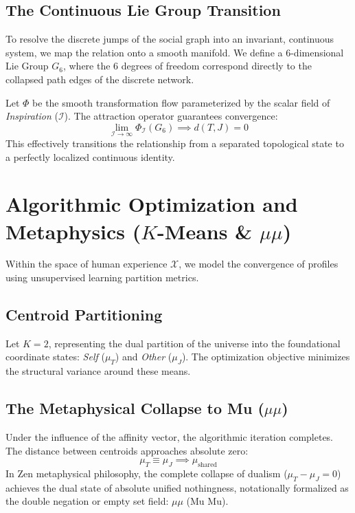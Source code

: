 \documentclass[11pt,fleqn]{article}
\begin{document}
\subsection{The Continuous Lie Group Transition}
To resolve the discrete jumps of the social graph into an invariant, continuous system, we map the relation onto a smooth manifold. We define a 6-dimensional Lie Group $G_6$, where the 6 degrees of freedom correspond directly to the collapsed path edges of the discrete network.

Let $\Phi$ be the smooth transformation flow parameterized by the scalar field of \textit{Inspiration} ($\mathcal{I}$). The attraction operator guarantees convergence:
\begin{equation}
    \lim_{\mathcal{I} \to \infty} \Phi_{\mathcal{I}}(G_6) \implies d(T, J) = 0
\end{equation}
This effectively transitions the relationship from a separated topological state to a perfectly localized continuous identity.

\section{Algorithmic Optimization and Metaphysics ($K$-Means \& $\mu\mu$)}
Within the space of human experience $\mathcal{X}$, we model the convergence of profiles using unsupervised learning partition metrics.

\subsection{Centroid Partitioning}
Let $K = 2$, representing the dual partition of the universe into the foundational coordinate states: \textit{Self} ($\mu_T$) and \textit{Other} ($\mu_J$). The optimization objective minimizes the structural variance around these means.

\subsection{The Metaphysical Collapse to Mu ($\mu\mu$)}
Under the influence of the affinity vector, the algorithmic iteration completes. The distance between centroids approaches absolute zero:
\begin{equation}
    \mu_T \equiv \mu_J \implies \mu_{\text{shared}}
\end{equation}
In Zen metaphysical philosophy, the complete collapse of dualism ($\mu_T - \mu_J = 0$) achieves the dual state of absolute unified nothingness, notationally formalized as the double negation or empty set field: \textbf{$\mu\mu$} (Mu Mu).
\end{document}
